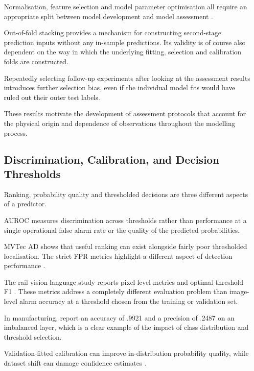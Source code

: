 Normalisation, feature selection and model parameter optimisation all require an appropriate split
between model development and model assessment \parencite{P004,P017}.

Out-of-fold stacking provides a mechanism for constructing second-stage prediction inputs without
any in-sample predictions. Its validity is of course also dependent on the way in which the
underlying fitting, selection and calibration folds are constructed.

Repeatedly selecting follow-up experiments after looking at the assessment results introduces
further selection bias, even if the individual model fits would have ruled out their outer test
labels.

These results motivate the development of assessment protocols that account for the physical origin
and dependence of observations throughout the modelling process.

\subsection{Discrimination, Calibration, and Decision Thresholds}

Ranking, probability quality and thresholded decisions are three different aspects of a predictor.

AUROC measures discrimination across thresholds rather than performance at a single operational
false alarm rate or the quality of the predicted probabilities.

MVTec AD shows that useful ranking can exist alongside fairly poor thresholded localisation. The
strict FPR metrics highlight a different aspect of detection performance
\parencite{Bergmann2019MVTec,Costanzino2024Multimodal,Cheng2025Multimodal}.

The rail vision-language study reports pixel-level metrics and optimal threshold F1 \parencite[PDF
p.~7]{P031}. These metrics address a completely different evaluation problem than image-level alarm
accuracy at a threshold chosen from the training or validation set.

In manufacturing, \textcite{Petrich2021Multimodal} report an accuracy of .9921 and a precision of .2487 on an
imbalanced layer, which is a clear example of the impact of class distribution and threshold
selection.

Validation-fitted calibration can improve in-distribution probability quality, while dataset shift
can damage confidence estimates \parencite{Guo2017Calibration,P008}.

